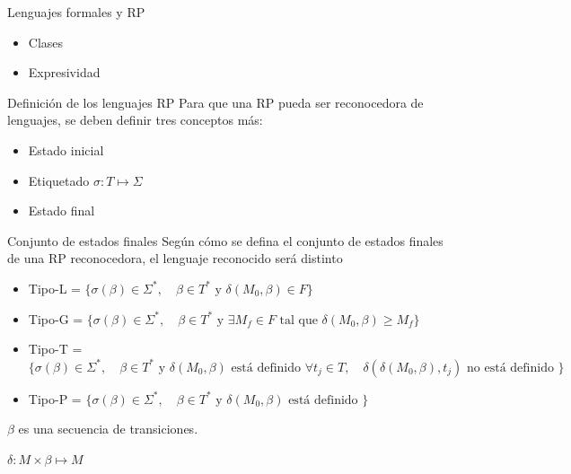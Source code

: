 \documentclass[
compress,
xcolor=table,
dvipsnames,
]{beamer}
\begin{document}

\begin{frame}{Lenguajes formales y RP}
    \begin{itemize}
        \item{Clases}
        \item{Expresividad}
    \end{itemize}
\end{frame}


\begin{frame}{Definición de los lenguajes RP}
    Para que una RP pueda ser reconocedora de lenguajes, se deben definir tres conceptos más:
    \begin{itemize}
        \item{Estado inicial}
        \item{Etiquetado $ \sigma: T \mapsto \Sigma$}
        \item Estado final
    \end{itemize}
\end{frame}


\begin{frame}{Conjunto de estados finales}
    Según cómo se defina el conjunto de estados finales de una RP reconocedora, el lenguaje reconocido será distinto \citep{Peterson:81}
    \begin{itemize}
        \item{Tipo-L = $\{\sigma(\beta) \in \Sigma^*, \quad \beta \in T^* \text{ y }\delta(M_0, \beta) \in F\}$}
        \item{Tipo-G = $\{\sigma(\beta) \in \Sigma^*, \quad \beta \in T^* \text{ y } \exists M_f \in F \text{ tal que } \delta(M_0, \beta) \geq M_f\}$}
        \item{Tipo-T = $\{\sigma(\beta) \in \Sigma^*, \quad \beta \in T^* \text{ y } \delta(M_0, \beta) \text{ está definido } \forall t_j \in T, \quad \delta(\delta(M_0, \beta), t_j) \text{ no está definido } \}$}
        \item{Tipo-P = $\{\sigma(\beta) \in \Sigma^*, \quad \beta \in T^* \text{ y } \delta(M_0, \beta) \text{ está definido }\}$}
    \end{itemize}

    \hfill \break 
    $\beta$ es una secuencia de transiciones.

    $\delta: M \times \beta \mapsto M$
\end{frame}
\end{document}
